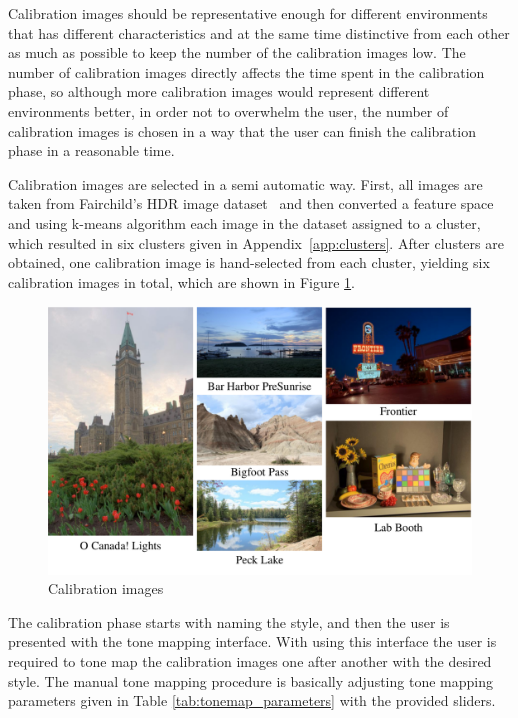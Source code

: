 Calibration images should be representative enough for different environments that has different characteristics and at the same time distinctive from each other as much as possible to keep the number of the calibration images low. The number of calibration images directly affects the time spent in the calibration phase, so although more calibration images would represent different environments better, in order not to overwhelm the user, the number of calibration images is chosen in a way that the user can finish the calibration phase in a reasonable time.

Calibration images are selected in a semi automatic way. First, all images are taken from Fairchild's HDR image dataset~\cite{fairchild2007hdr} and then converted a feature space and using k-means algorithm each image in the dataset assigned to a cluster, which resulted in six clusters given in Appendix~\ref{app:clusters}. After clusters are obtained, one calibration image is hand-selected from each cluster, yielding six calibration images in total, which are shown in Figure \ref{fig:calibration_images}.

\begin{figure}
\begin{center}
\includegraphics[width=\textwidth]{figures/chapter5/temp_calibration_images.png}
\caption{Calibration images
}
\label{fig:calibration_images}
\end{center}
\end{figure}

The calibration phase starts with naming the style, and then the user is presented with the tone mapping interface. With using this interface the user is required to tone map the calibration images one after another with the desired style. The manual tone mapping procedure is basically adjusting tone mapping parameters given in Table \ref{tab:tonemap_parameters} with the provided sliders.

